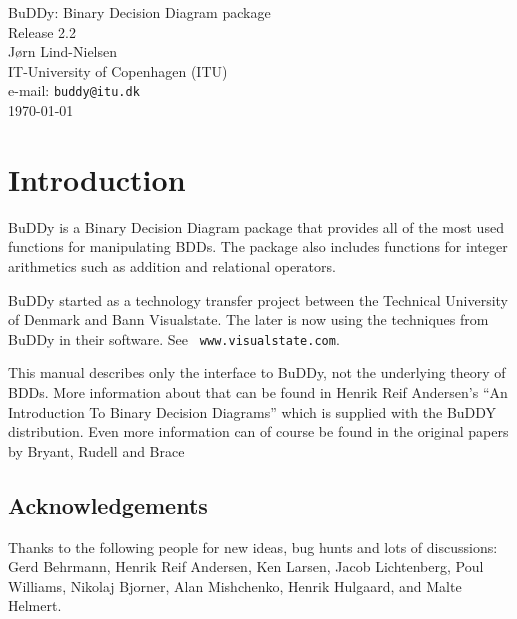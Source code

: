 \documentclass[a4paper,11pt,twoside,fleqn,openright]{report}
\begin{document}
\begin{titlepage}
  \begin{center}
    \vspace{1in}
    {\Large BuDDy: Binary Decision Diagram package\\Release 2.2}\\[1em]
    {\large J\o{}rn Lind-Nielsen\\
    IT-University of Copenhagen (ITU)\\
    e-mail: {\tt buddy@itu.dk}\\
    \today}

    \vspace{1in}
    
  \end{center}
\end{titlepage}

\pagestyle{empty}
\cleardoublepage
{}
\pagestyle{plain}
\tableofcontents

\chapter{Introduction}

BuDDy is a Binary Decision Diagram package that provides all of the
most used functions for manipulating BDDs. The package also includes
functions for integer arithmetics such as addition and relational
operators.

BuDDy started as a technology transfer project between the Technical
University of Denmark and Bann Visualstate. The later is now using the
techniques from BuDDy in their software. See {\tt
  www.visualstate.com}.

This manual describes only the interface to BuDDy, not the underlying
theory of BDDs. More information about that can be found in Henrik
Reif Andersen's ``An Introduction To Binary Decision Diagrams'' which
is supplied with the BuDDY distribution. Even more information can of
course be found in the original papers by Bryant, Rudell and
Brace~\cite{bryant-1986-gba, bryant-1990-eib, bryant-1992-sbm,
  rudell-1993-dvo}

\section{Acknowledgements}

Thanks to the following people for new ideas, bug hunts and lots of
discussions: Gerd Behrmann, Henrik Reif Andersen, Ken Larsen, Jacob
Lichtenberg, Poul Williams, Nikolaj Bjorner, Alan Mishchenko, Henrik
Hulgaard, and Malte Helmert.
\end{document}
